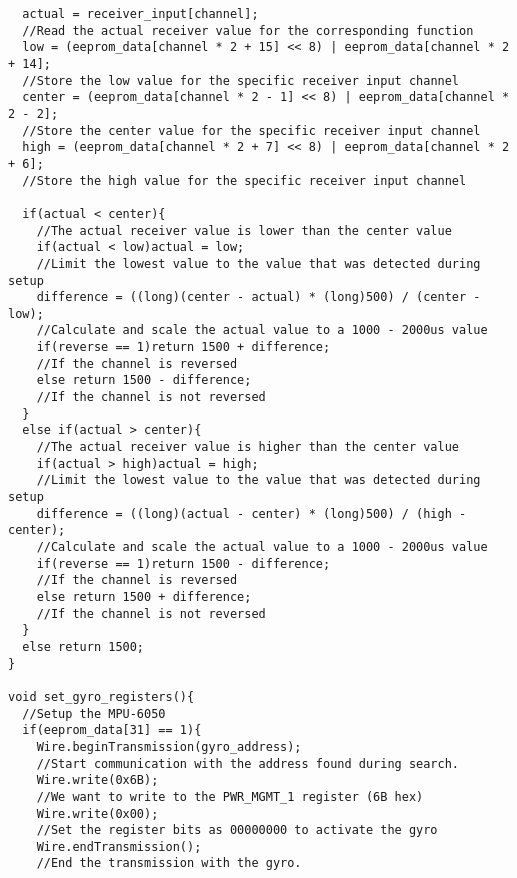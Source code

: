 \begin{lstlisting}
  actual = receiver_input[channel];                                            
  //Read the actual receiver value for the corresponding function
  low = (eeprom_data[channel * 2 + 15] << 8) | eeprom_data[channel * 2 + 14];  
  //Store the low value for the specific receiver input channel
  center = (eeprom_data[channel * 2 - 1] << 8) | eeprom_data[channel * 2 - 2]; 
  //Store the center value for the specific receiver input channel
  high = (eeprom_data[channel * 2 + 7] << 8) | eeprom_data[channel * 2 + 6];   
  //Store the high value for the specific receiver input channel

  if(actual < center){                                                         
    //The actual receiver value is lower than the center value
    if(actual < low)actual = low;                                              
    //Limit the lowest value to the value that was detected during setup
    difference = ((long)(center - actual) * (long)500) / (center - low);       
    //Calculate and scale the actual value to a 1000 - 2000us value
    if(reverse == 1)return 1500 + difference;                                  
    //If the channel is reversed
    else return 1500 - difference;                                             
    //If the channel is not reversed
  }
  else if(actual > center){                                                                        
    //The actual receiver value is higher than the center value
    if(actual > high)actual = high;                                            
    //Limit the lowest value to the value that was detected during setup
    difference = ((long)(actual - center) * (long)500) / (high - center);      
    //Calculate and scale the actual value to a 1000 - 2000us value
    if(reverse == 1)return 1500 - difference;                                  
    //If the channel is reversed
    else return 1500 + difference;                                             
    //If the channel is not reversed
  }
  else return 1500;
}

void set_gyro_registers(){
  //Setup the MPU-6050
  if(eeprom_data[31] == 1){
    Wire.beginTransmission(gyro_address);                                      
    //Start communication with the address found during search.
    Wire.write(0x6B);                                                          
    //We want to write to the PWR_MGMT_1 register (6B hex)
    Wire.write(0x00);                                                          
    //Set the register bits as 00000000 to activate the gyro
    Wire.endTransmission();                                                    
    //End the transmission with the gyro.


\end{lstlisting}
